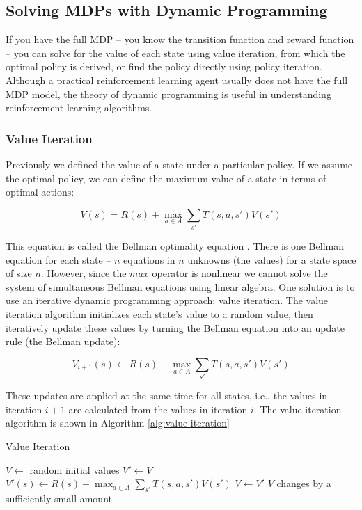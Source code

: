 \subsection{Solving MDPs with Dynamic Programming}

If you have the full MDP -- you know the transition function and reward function -- you can solve for the value of each state using value iteration, from which the optimal policy is derived, or find the policy directly using policy iteration. Although a practical reinforcement learning agent usually does not have the full MDP model, the theory of dynamic programming is useful in understanding reinforcement learning algorithms.

\subsubsection{Value Iteration}

Previously we defined the value of a state under a particular policy. If we assume the optimal policy, we can define the maximum value of a state in terms of optimal actions:

\begin{equation}\label{eqn:bellman-equation}
V(s) = R(s) + \max_{a \in A} \sum_{s'} T(s, a, s') V(s')
\end{equation}

This equation is called the Bellman optimality equation \cite{bellman1957dynamic,bertsekas2012dynamic}. There is one Bellman equation for each state -- $n$ equations in $n$ unknowns (the values) for a state space of size $n$. However, since the $max$ operator is nonlinear we cannot solve the system of simultaneous Bellman equations using linear algebra. One solution is to use an iterative dynamic programming approach: value iteration. The value iteration algorithm initializes each state's value to a random value, then iteratively update these values by turning the Bellman equation into an update rule (the Bellman update):

\begin{equation}\label{eqn:bellman-update}
V_{i+1}(s) \leftarrow R(s) + \max_{a \in A} \sum_{s'} T(s, a, s') V(s')
\end{equation}

These updates are applied at the same time for all states, i.e., the values in iteration $i+1$ are calculated from the values in iteration $i$. The value iteration algorithm is shown in Algorithm \ref{alg:value-iteration}


\begin{algorithm}
  \caption{Value Iteration}\label{alg:value-iteration}
  \begin{algorithmic}
    \State $V \gets$ random initial values
    \Repeat
      \State $V' \gets V$
        \State $V'(s) \gets R(s) + \max_{a \in A} \sum_{s'} T(s, a, s') V(s')$
      \EndFor
      \State $V \gets V'$
    \Until $V$ changes by a sufficiently small amount
  \end{algorithmic}
\end{algorithm}

